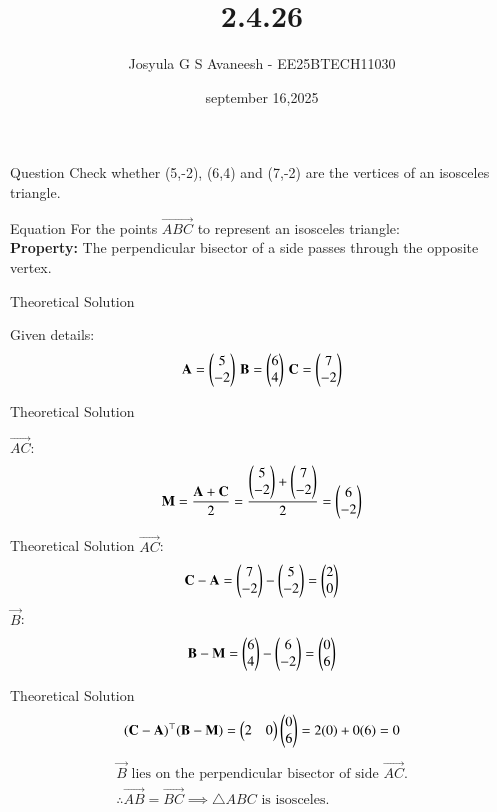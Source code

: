 \documentclass{beamer}
\title %
{2.4.26}
\date{september 16,2025}
\author 
{Josyula G S Avaneesh - EE25BTECH11030}
\begin{document}
\frame{\titlepage}
\begin{frame}{Question}
Check whether (5,-2), (6,4) and (7,-2) are the vertices of an isosceles triangle.
\end{frame}



\begin{frame}{Equation}
For the points $\vec{ABC}$ to represent an isosceles triangle:\\
\textbf{Property:} The perpendicular bisector of a side passes through the opposite vertex.
\end{frame}
\begin{frame}{Theoretical Solution}

Given details:
\begin{align}
    \mathbf{A}=\begin{pmatrix}5 \\ -2\end{pmatrix}\, \mathbf{B}=\begin{pmatrix}6 \\ 4\end{pmatrix}\, \mathbf{C}=\begin{pmatrix}7\\-2\end{pmatrix}
\end{align}
\end{frame}

\begin{frame}{Theoretical Solution}

 $\vec{AC}$: 
\begin{align}
 \mathbf{M} = \frac{\mathbf{A}+\mathbf{C}}{2} 
= \frac{\begin{pmatrix}5\\-2\end{pmatrix}+\begin{pmatrix}7\\-2\end{pmatrix}}{2} 
= \begin{pmatrix}6\\-2\end{pmatrix}
\end{align}
\end{frame}


\begin{frame}{Theoretical Solution}
 $\vec{AC}$: 
\begin{align}
 \mathbf{C}-\mathbf{A} = \begin{pmatrix}7\\-2\end{pmatrix}-\begin{pmatrix}5\\-2\end{pmatrix} 
= \begin{pmatrix}2\\0\end{pmatrix}
\end{align}
 $\vec{B}$:
\begin{align}
\mathbf{B}-\mathbf{M} = \begin{pmatrix}6\\4\end{pmatrix}-\begin{pmatrix}6\\-2\end{pmatrix} 
= \begin{pmatrix}0\\6\end{pmatrix}
\end{align}
\end{frame}
\begin{frame}{Theoretical Solution}
\begin{align}
(\mathbf{C}-\mathbf{A})^\top(\mathbf{B}-\mathbf{M}) 
= \begin{pmatrix}2&0\end{pmatrix}\begin{pmatrix}0\\6\end{pmatrix} = 2(0)+0(6)=0
\end{align}
\begin{align*}
 \vec{B} \text{ lies on the perpendicular bisector of side } \vec{AC}.\\
 \therefore \vec{AB} = \vec{BC} \implies \triangle ABC \text{ is isosceles.}
\end{align*}
\end{frame}
\end{document}
